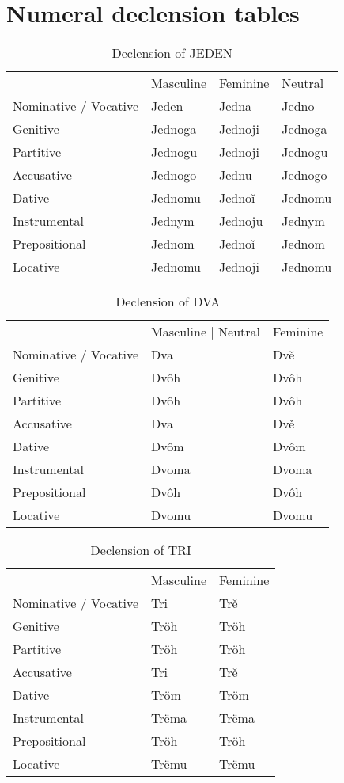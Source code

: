 \section{Numeral declension tables}

\begin{table}[!htb]
	\caption{Declension of JEDEN} 
	\begin{tabular}{llll}
		& Masculine & Feminine & Neutral \\
		Nominative / Vocative & Jeden & Jedna & Jedno \\
		Genitive & Jednoga & Jednoji & Jednoga \\
		Partitive & Jednogu & Jednoji & Jednogu \\
		Accusative & Jednogo & Jednu & Jednogo \\
		Dative & Jednomu & Jednoǐ & Jednomu \\
		Instrumental & Jednym & Jednoju & Jednym \\
		Prepositional & Jednom & Jednoǐ & Jednom \\
		Locative & Jednomu & Jednoji & Jednomu \\
	\end{tabular}
\end{table}

\begin{table}[!htb]
	\caption{Declension of DVA}
	\begin{tabular}{lll}
		& Masculine | Neutral & Feminine \\
		Nominative / Vocative & Dva & Dvě \\
		Genitive & Dvôh & Dvôh \\
		Partitive & Dvôh & Dvôh \\
		Accusative & Dva & Dvě \\
		Dative & Dvôm & Dvôm \\
		Instrumental & Dvoma & Dvoma \\
		Prepositional & Dvôh & Dvôh \\
		Locative & Dvomu & Dvomu \\
	\end{tabular}
\end{table}

\begin{table}[!htb]
	\caption{Declension of TRI}
	\begin{tabular}{lll}
		& Masculine & Feminine \\
		Nominative / Vocative & Tri & Trě \\
		Genitive & Tröh & Tröh \\
		Partitive & Tröh & Tröh \\
		Accusative & Tri & Trě \\
		Dative & Tröm & Tröm \\
		Instrumental & Trëma & Trëma \\
		Prepositional & Tröh & Tröh \\
		Locative & Trëmu & Trëmu \\
	\end{tabular}
\end{table}

